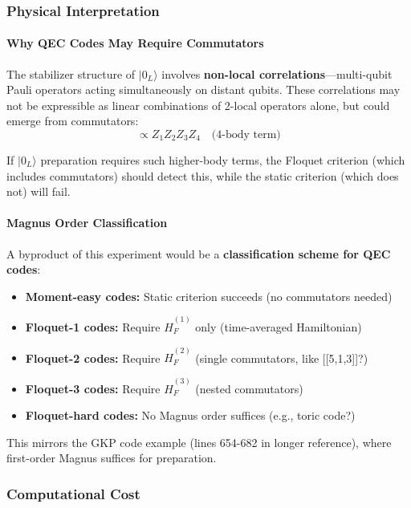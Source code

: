 \subsubsection{Physical Interpretation}

\paragraph{Why QEC Codes May Require Commutators}

The stabilizer structure of $|0_L\rangle$ involves \textbf{non-local correlations}—multi-qubit Pauli operators acting simultaneously on distant qubits. These correlations may not be expressible as linear combinations of 2-local operators alone, but could emerge from commutators:
\begin{equation}
[Z_1 Z_2, Z_3 Z_4] \propto Z_1 Z_2 Z_3 Z_4 \quad \text{(4-body term)}
\end{equation}

If $|0_L\rangle$ preparation requires such higher-body terms, the Floquet criterion (which includes commutators) should detect this, while the static criterion (which does not) will fail.

\paragraph{Magnus Order Classification}

A byproduct of this experiment would be a \textbf{classification scheme for QEC codes}:
\begin{itemize}
\item \textbf{Moment-easy codes:} Static criterion succeeds (no commutators needed)
\item \textbf{Floquet-1 codes:} Require $\hat{H}_F^{(1)}$ only (time-averaged Hamiltonian)
\item \textbf{Floquet-2 codes:} Require $\hat{H}_F^{(2)}$ (single commutators, like [[5,1,3]]?)
\item \textbf{Floquet-3 codes:} Require $\hat{H}_F^{(3)}$ (nested commutators)
\item \textbf{Floquet-hard codes:} No Magnus order suffices (e.g., toric code?)
\end{itemize}

This mirrors the GKP code example (lines 654-682 in longer reference), where first-order Magnus suffices for preparation.

\subsubsection{Computational Cost}

